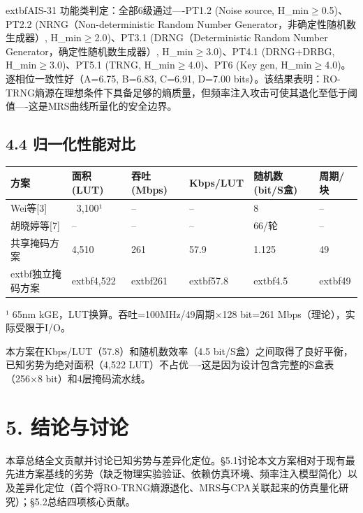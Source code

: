 \documentclass[journal]{IEEEtran}
\begin{document}
	extbf{AIS-31 功能类判定}：全部6级通过----PT1.2 (Noise source, H\_min$\geq$0.5)、PT2.2 (NRNG（Non-deterministic Random Number Generator，非确定性随机数生成器）, H\_min$\geq$2.0)、PT3.1 (DRNG（Deterministic Random Number Generator，确定性随机数生成器）, H\_min$\geq$3.0)、PT4.1 (DRNG+DRBG, H\_min$\geq$3.0)、PT5.1 (TRNG, H\_min$\geq$4.0)、PT6 (Key gen, H\_min$\geq$4.0)。逐相位一致性好（A=6.75, B=6.83, C=6.91, D=7.00 bits）。该结果表明：RO-TRNG熵源在理想条件下具备足够的熵质量，但频率注入攻击可使其退化至低于阈值----这是MRS曲线所量化的安全边界。

%


\subsection{4.4 归一化性能对比}

\begin{table}[h]
\centering
\begin{tabular}{llllll}
\hline
\textbf{方案} & \textbf{面积 (LUT)} & \textbf{吞吐 (Mbps)} & \textbf{Kbps/LUT} & \textbf{随机数 (bit/S盒)} & \textbf{周期/块} \\
\hline
Wei等[3] & ~3,100¹ & -- & -- & 8 & -- \\
胡晓婷等[7] & -- & -- & -- & 66/轮 & -- \\
共享掩码方案 & 4,510 & 261 & 57.9 & 1.125 & 49 \\
	extbf{独立掩码方案} & 	extbf{4,522} & 	extbf{261} & 	extbf{57.8} & 	extbf{4.5} & 	extbf{49} \\
\hline
\end{tabular}
\end{table}

¹ 65nm kGE，LUT换算。吞吐=100MHz/49周期$\times$128 bit=261 Mbps（理论），实际受限于I/O。

本方案在Kbps/LUT（57.8）和随机数效率（4.5 bit/S盒）之间取得了良好平衡，已知劣势为绝对面积（4,522 LUT）不占优----这是因为设计包含完整的S盒表（256$\times$8 bit）和4层掩码流水线。

%


\section{5. 结论与讨论}

本章总结全文贡献并讨论已知劣势与差异化定位。§5.1讨论本文方案相对于现有最先进方案基线的劣势（缺乏物理实验验证、依赖仿真环境、频率注入模型简化）以及差异化定位（首个将RO-TRNG熵源退化、MRS与CPA关联起来的仿真量化研究）；§5.2总结四项核心贡献。
\end{document}
